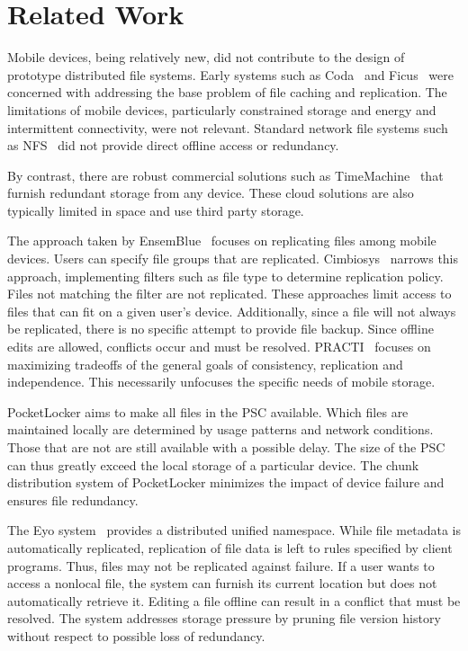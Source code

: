 
\section{Related Work}
\label{sec-related}

Mobile devices, being relatively new, did not contribute to the design of
prototype distributed file systems.  Early systems such as
Coda~\cite{kistler1992disconnected} and Ficus~\cite{guy1990implementation} were
concerned with addressing the base problem of file caching and replication.
The limitations of mobile devices, particularly constrained storage and energy
and intermittent connectivity, were not relevant.  Standard network file
systems such as NFS~\cite{nowicki1989nfs} did not provide direct offline access
or redundancy.

By contrast, there are robust commercial solutions such as
TimeMachine~\cite{timemachine} that furnish redundant storage from any device.
These cloud solutions are also typically limited in space and use third party
storage.

The approach taken by EnsemBlue~\cite{peek2006ensemblue} focuses on replicating
files among mobile devices.  Users can specify file groups that are
replicated.  Cimbiosys~\cite{ramasubramanian2009cimbiosys}
narrows this approach, implementing filters such as file type to determine
replication policy.  Files not matching the filter are not replicated.
These approaches limit access to files that can fit on a given user's
device.  Additionally, since a file will not always be replicated, there is no
specific attempt to provide file backup.  Since offline edits are allowed,
conflicts occur and must be resolved.  PRACTI~\cite{belaramani2006practi}
focuses on maximizing tradeoffs of the general goals of consistency,
replication and independence.  This necessarily unfocuses the specific needs of
mobile storage.

PocketLocker aims to make all files in the PSC available.  Which files are
maintained locally are determined by usage patterns and network conditions.
Those that are not are still available with a possible delay.  The size of the
PSC can thus greatly exceed the local storage of a particular device.  The
chunk distribution system of PocketLocker minimizes the impact of device
failure and ensures file redundancy.

The Eyo system~\cite{strauss2010device} provides a distributed unified
namespace.  While file metadata is automatically replicated, replication of
file data is left to rules specified by client programs.  Thus, files may not
be replicated against failure.  If a user wants to access a nonlocal file, the
system can furnish its current location but does not automatically retrieve it.
Editing a file offline can result in a conflict that must be resolved.  The
system addresses storage pressure by pruning file version history without
respect to possible loss of redundancy.

